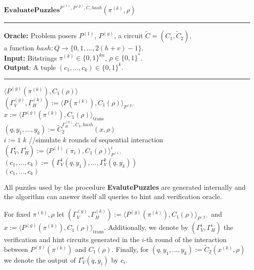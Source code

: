 \begin{codeblock}
  $\textbf{EvaluatePuzzles}^{P^{(1)}, P^{(g)}, \widetilde{C}, hash}(\pi^{(k)}, \rho)$
  \medskip \hrule \medskip
  \textbf{Oracle:}  Problem posers $P^{(1)}$, $P^{(g)}$, a circuit $\widetilde{C} = (C_1, \widetilde{C}_2)$,\\
  \IndII a function $hash : Q \rightarrow \{0,1,\dots, 2(h+v)-1\}$.\\
  \textbf{Input:} Bitstrings $\pi^{(k)} \in \{0,1\}^{kn}$, $\rho \in \{0,1\}^{*}$.\\
  \textbf{Output}: A tuple $(c_1, \dots, c_k) \in \{0,1\}^{k}$.
  \medskip\hrule\medskip
  \Run $\langle P^{(g)}(\pi^{(k)}), C_1(\rho) \rangle$ \\
  \IndI $(\Gamma_V^{(g)}, \Gamma_H^{(k)}) := \langle P(\pi^{(k)}), C_1(\rho) \rangle_{P^{(g)}}$ \\
  \IndI $x := \langle P^{(g)}(\pi^{(k)}), C_1(\rho) \rangle_{\text{trans}}$ \\
  $(q, y_1, \dots, y_k) := \widetilde{C}_2^{\Gamma_H^{(k)}, C_2, hash} (x, \rho)$ \\
  \For $i:=1$ \To $k$ \Do \IndII //simulate $k$ rounds of sequential interaction \\
  \IndI $(\Gamma_V^{i}, \Gamma_H^{i}) := \langle P^{(1)}(\pi_i), C_1(\rho) \rangle_{P^{(1)}}^i$\\
  $(c_1, \dots, c_k) := (\Gamma_V^{1}(q, y_1), \dots, \Gamma_V^{k}(q, y_k))$\\
  \return $(c_1, \dots, c_k)$
\end{codeblock}
%
All puzzles used by the procedure \textbf{EvalutePuzzles} are generated internally and the algorithm can answer itself
all queries to hint and verification oracle.

For fixed $\pi^{(k)}, \rho$ let $(\Gamma_V^{(g)}, \Gamma_H^{(k)}) := \langle P^{(g)}(\pi^{(k)}), C_1(\rho) \rangle_{P^{(g)}}$
and $x := \langle P^{(g)}(\pi^{(k)}), C_1(\rho) \rangle_{\text{trans}}$.
Additionally, we denote by $(\Gamma_V^{i}, \Gamma_H^{i})$ the verification and hint circuits generated in the $i$-th
round of the interaction between $P^{(g)}(\pi^{(k)})$ and $C_1(\rho)$.
Finally, for $(q,y_1, \dots, y_k) := \widetilde{C}_2(x^{(k)}, \rho)$ we denote the output of $\Gamma_V^i(q,y_i)$ by $c_i$.

